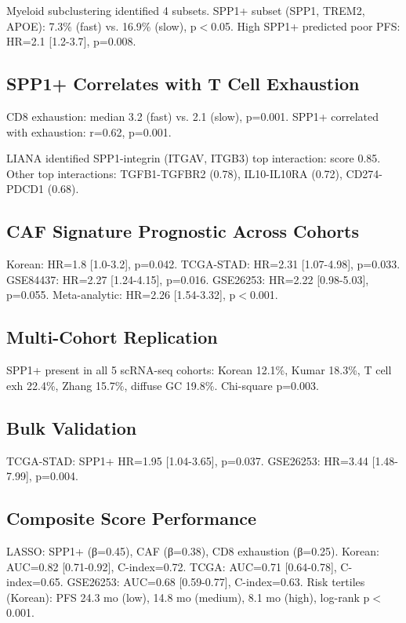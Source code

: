 \documentclass[12pt,twoside]{article}
\begin{document}
Myeloid subclustering identified 4 subsets. SPP1+ subset (SPP1, TREM2, APOE): 7.3\% (fast) vs. 16.9\% (slow), p$<$0.05. High SPP1+ predicted poor PFS: HR=2.1 [1.2-3.7], p=0.008.

\subsection{SPP1+ Correlates with T Cell Exhaustion}

CD8 exhaustion: median 3.2 (fast) vs. 2.1 (slow), p=0.001. SPP1+ correlated with exhaustion: r=0.62, p=0.001.

LIANA identified SPP1-integrin (ITGAV, ITGB3) top interaction: score 0.85. Other top interactions: TGFB1-TGFBR2 (0.78), IL10-IL10RA (0.72), CD274-PDCD1 (0.68).

\subsection{CAF Signature Prognostic Across Cohorts}

Korean: HR=1.8 [1.0-3.2], p=0.042. TCGA-STAD: HR=2.31 [1.07-4.98], p=0.033. GSE84437: HR=2.27 [1.24-4.15], p=0.016. GSE26253: HR=2.22 [0.98-5.03], p=0.055. Meta-analytic: HR=2.26 [1.54-3.32], p$<$0.001.

\subsection{Multi-Cohort Replication}

SPP1+ present in all 5 scRNA-seq cohorts: Korean 12.1\%, Kumar 18.3\%, T cell exh 22.4\%, Zhang 15.7\%, diffuse GC 19.8\%. Chi-square p=0.003.

\subsection{Bulk Validation}

TCGA-STAD: SPP1+ HR=1.95 [1.04-3.65], p=0.037. GSE26253: HR=3.44 [1.48-7.99], p=0.004.

\subsection{Composite Score Performance}

LASSO: SPP1+ (β=0.45), CAF (β=0.38), CD8 exhaustion (β=0.25). Korean: AUC=0.82 [0.71-0.92], C-index=0.72. TCGA: AUC=0.71 [0.64-0.78], C-index=0.65. GSE26253: AUC=0.68 [0.59-0.77], C-index=0.63. Risk tertiles (Korean): PFS 24.3 mo (low), 14.8 mo (medium), 8.1 mo (high), log-rank p$<$0.001.
\end{document}
